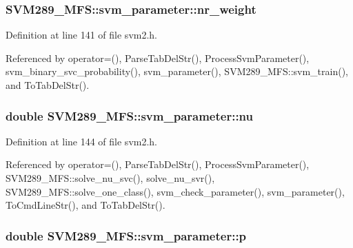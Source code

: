 \subsubsection[{\texorpdfstring{nr\+\_\+weight}{nr_weight}}]{ S\+V\+M289\+\_\+\+M\+F\+S\+::svm\+\_\+parameter\+::nr\+\_\+weight}\hypertarget{struct_s_v_m289___m_f_s_1_1svm__parameter_a7c87bf61e72f27b04efe132672b432a1}{}\label{struct_s_v_m289___m_f_s_1_1svm__parameter_a7c87bf61e72f27b04efe132672b432a1}


Definition at line 141 of file svm2.\+h.



Referenced by operator=(), Parse\+Tab\+Del\+Str(), Process\+Svm\+Parameter(), svm\+\_\+binary\+\_\+svc\+\_\+probability(), svm\+\_\+parameter(), S\+V\+M289\+\_\+\+M\+F\+S\+::svm\+\_\+train(), and To\+Tab\+Del\+Str().

\subsubsection[{\texorpdfstring{nu}{nu}}]{\setlength{\rightskip}{0pt plus 5cm}double S\+V\+M289\+\_\+\+M\+F\+S\+::svm\+\_\+parameter\+::nu}\hypertarget{struct_s_v_m289___m_f_s_1_1svm__parameter_a51d3d06c7a7a38a8c315092f14c3029c}{}\label{struct_s_v_m289___m_f_s_1_1svm__parameter_a51d3d06c7a7a38a8c315092f14c3029c}


Definition at line 144 of file svm2.\+h.



Referenced by operator=(), Parse\+Tab\+Del\+Str(), Process\+Svm\+Parameter(), S\+V\+M289\+\_\+\+M\+F\+S\+::solve\+\_\+nu\+\_\+svc(), solve\+\_\+nu\+\_\+svr(), S\+V\+M289\+\_\+\+M\+F\+S\+::solve\+\_\+one\+\_\+class(), svm\+\_\+check\+\_\+parameter(), svm\+\_\+parameter(), To\+Cmd\+Line\+Str(), and To\+Tab\+Del\+Str().

\subsubsection[{\texorpdfstring{p}{p}}]{\setlength{\rightskip}{0pt plus 5cm}double S\+V\+M289\+\_\+\+M\+F\+S\+::svm\+\_\+parameter\+::p}\hypertarget{struct_s_v_m289___m_f_s_1_1svm__parameter_a4b725c044491ebddf8f2c290af4fd288}{}\label{struct_s_v_m289___m_f_s_1_1svm__parameter_a4b725c044491ebddf8f2c290af4fd288}


